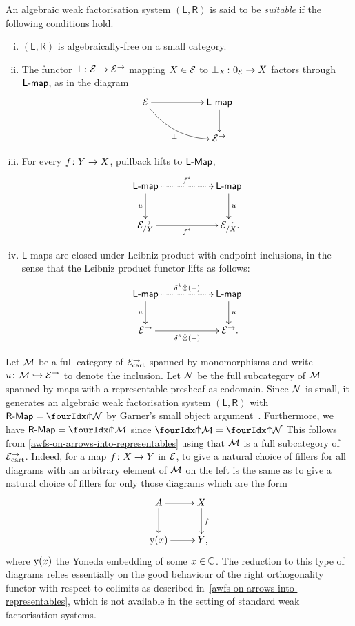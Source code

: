 \documentclass[reqno,10pt,a4paper,oneside,draft]{amsart}
\newcommand{\LL}{\mathsf{L}}
\newcommand{\RR}{\mathsf{R}}
\begin{document}
{{\begin{definition} \label{thm:suitable-awfs}
An algebraic weak factorisation system $(\LL, \RR)$ is said to be \emph{suitable} if the following conditions hold.
\begin{enumerate}[(i)]
\item $(\LL, \RR)$ is algebraically-free on a small category.
\item The functor $\bot \co \cal{E} \to \cal{E}^\to$ mapping $X \in \cal{E}$ to $\bot_X \co 0_{\cal{E}} \to X$ factors through
$\pcoalg{\LL}$, as in the diagram
\[
\xymatrix@C+3em{
\catE \ar[r] \ar@/_1pc/[dr]_{\bot} & \pcoalg{\LL} \ar[d] \\
  & \catE^\to}
\]
\item For every $f \co Y \to X$, pullback lifts to $\pCoalg{\LL}$, 
\[
\xymatrix@C+3em{
  \pcoalg{\LL}
  \ar@{.>}[r]^{f^*}
  \ar[d]_{u}
&
  \pcoalg{\LL}
  \ar[d]^{u}
\\
  \catE^\to_{/Y}
  \ar[r]_{f^*}
&
  \catE^\to_{/X}
\rlap{.}}
\]
\item $\LL$-maps are closed under Leibniz product with endpoint inclusions, in the sense that the Leibniz product functor
lifts as follows:
\[
\xymatrix@C+3em{
  \pcoalg{\LL}
  \ar@{.>}[r]^{\kcyl \hatotimes (-)}
  \ar[d]_{u}
&
  \pcoalg{\LL}
  \ar[d]^{u}
\\
  \catE^\to
  \ar[r]_{\kcyl \hatotimes (-)}
&
  \catE^\to
\rlap{.}}
\]
\end{enumerate}
\end{definition}



\begin{remark} \label{thm:sset-cset-suitable}
Let $\cal{M}$ be a full category of $\cal{E}^\to_\cart$ spanned by monomorphisms and write~$u \co \cal{M} \hookrightarrow \catE^\to$ to denote the inclusion. Let $\cal{N}$ be the full subcategory of $\cal{M}$ spanned by maps with a representable presheaf as codomain. 
Since $\cal{N}$ is small, it generates an algebraic weak factorisation system $(\LL, \RR)$ with $\pAlg{\RR} =  \liftr{\cal{N}}$ by Garner's small object argument~\cite{garner:small-object-argument}. Furthermore, we have $\pAlg{\RR} =  \liftr{\cal{M}}$ since $\liftr{\cal{M}} = \liftr{\cal{N}}$
This follows from \cref{awfs-on-arrows-into-representables} using that $\cal{M}$ is a full subcategory of $\cal{E}^\to_\cart$. Indeed, for a map $f \co X \to Y$ in $\catE$, to give a natural choice of fillers for all diagrams with an arbitrary element of $\cal{M}$ on the left is the same as to give a natural choice of fillers for only those diagrams which are the form
\[
\xymatrix{
  A
  \ar[r]
  \ar[d]
&
  X
  \ar[d]^f
\\
  \yon(x)
  \ar[r]
&
  Y
\rlap{,}}
\]
where $\yon(x)$ the Yoneda embedding of some $x \in \catC$.
The reduction to this type of diagrams relies essentially on the good behaviour of the right orthogonality functor with respect to colimits as described in~\cref{awfs-on-arrows-into-representables}, which is not available in the setting of standard weak factorisation systems. 
\end{remark} 


}}
\end{document}
